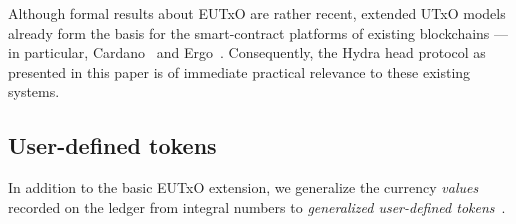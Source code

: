 Although formal results about EUTxO are rather recent, extended UTxO models already form the basis for the smart-contract platforms of existing blockchains --- in particular, Cardano~\cite{plutus-platform} and Ergo~\cite{ergo-platform}. Consequently, the Hydra head protocol as presented in this paper is of immediate practical relevance to these existing systems.

\subsection{User-defined tokens}

In addition to the basic EUTxO extension, we generalize the currency \emph{values} recorded on the ledger from integral numbers to \emph{generalized user-defined tokens}~\cite{eutxo-2}.

  


